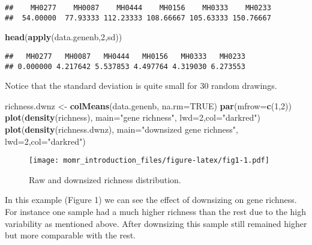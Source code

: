 \documentclass[]{article}
\newenvironment{Shaded}{\begin{snugshade}}{\end{snugshade}}
\newcommand{\KeywordTok}[1]{\textcolor[rgb]{0.13,0.29,0.53}{\textbf{{#1}}}}
\newcommand{\DataTypeTok}[1]{\textcolor[rgb]{0.13,0.29,0.53}{{#1}}}
\newcommand{\DecValTok}[1]{\textcolor[rgb]{0.00,0.00,0.81}{{#1}}}
\newcommand{\StringTok}[1]{\textcolor[rgb]{0.31,0.60,0.02}{{#1}}}
\newcommand{\OtherTok}[1]{\textcolor[rgb]{0.56,0.35,0.01}{{#1}}}
\newcommand{\NormalTok}[1]{{#1}}
\begin{document}
\begin{verbatim}
##    MH0277    MH0087    MH0444    MH0156    MH0333    MH0233 
##  54.00000  77.93333 112.23333 108.66667 105.63333 150.76667
\end{verbatim}

\begin{Shaded}
\begin{Highlighting}[]
\KeywordTok{head}\NormalTok{(}\KeywordTok{apply}\NormalTok{(data.genenb,}\DecValTok{2}\NormalTok{,sd))}
\end{Highlighting}
\end{Shaded}

\begin{verbatim}
##   MH0277   MH0087   MH0444   MH0156   MH0333   MH0233 
## 0.000000 4.217642 5.537853 4.497764 4.319030 6.273553
\end{verbatim}

Notice that the standard deviation is quite small for 30 random
drawings.

\begin{Shaded}
\begin{Highlighting}[]
\NormalTok{richness.dwnz <-}\StringTok{ }\KeywordTok{colMeans}\NormalTok{(data.genenb, }\DataTypeTok{na.rm=}\OtherTok{TRUE}\NormalTok{)}
\KeywordTok{par}\NormalTok{(}\DataTypeTok{mfrow=}\KeywordTok{c}\NormalTok{(}\DecValTok{1}\NormalTok{,}\DecValTok{2}\NormalTok{))}
\KeywordTok{plot}\NormalTok{(}\KeywordTok{density}\NormalTok{(richness), }\DataTypeTok{main=}\StringTok{"gene richness"}\NormalTok{, }\DataTypeTok{lwd=}\DecValTok{2}\NormalTok{,}\DataTypeTok{col=}\StringTok{"darkred"}\NormalTok{)}
\KeywordTok{plot}\NormalTok{(}\KeywordTok{density}\NormalTok{(richness.dwnz), }\DataTypeTok{main=}\StringTok{"downsized gene richness"}\NormalTok{, }\DataTypeTok{lwd=}\DecValTok{2}\NormalTok{,}\DataTypeTok{col=}\StringTok{"darkred"}\NormalTok{)}
\end{Highlighting}
\end{Shaded}

\begin{figure}[htbp]
\centering
\texttt{[image: momr\_introduction\_files/figure-latex/fig1-1.pdf]}
\caption{Raw and downsized richness distribution.}
\end{figure}

In this example (Figure 1) we can see the effect of downsizing on gene
richness. For instance one sample had a much higher richness than the
rest due to the high variability as mentioned above. After downsizing
this sample still remained higher but more comparable with the rest.
\end{document}
